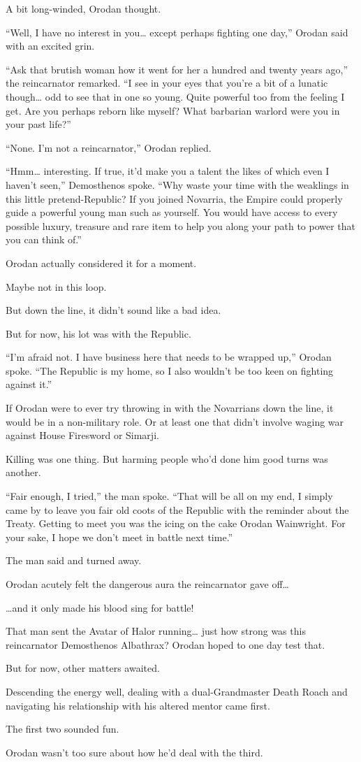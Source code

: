 \documentclass[a4paper,10pt]{book}
\begin{document}
A bit long-winded, Orodan thought.\par
“Well, I have no interest in you… except perhaps fighting one day,” Orodan said with an excited grin.\par
“Ask that brutish woman how it went for her a hundred and twenty years ago,” the reincarnator remarked. “I see in your eyes that you’re a bit of a lunatic though… odd to see that in one so young. Quite powerful too from the feeling I get. Are you perhaps reborn like myself? What barbarian warlord were you in your past life?”\par
“None. I’m not a reincarnator,” Orodan replied.\par
“Hmm… interesting. If true, it’d make you a talent the likes of which even I haven’t seen,” Demosthenos spoke. “Why waste your time with the weaklings in this little pretend-Republic? If you joined Novarria, the Empire could properly guide a powerful young man such as yourself. You would have access to every possible luxury, treasure and rare item to help you along your path to power that you can think of.”\par
Orodan actually considered it for a moment.\par
Maybe not in this loop.\par
But down the line, it didn’t sound like a bad idea.\par
But for now, his lot was with the Republic.\par
“I’m afraid not. I have business here that needs to be wrapped up,” Orodan spoke. “The Republic is my home, so I also wouldn’t be too keen on fighting against it.”\par
If Orodan were to ever try throwing in with the Novarrians down the line, it would be in a non-military role. Or at least one that didn’t involve waging war against House Firesword or Simarji.\par
Killing was one thing. But harming people who'd done him good turns was another.\par
“Fair enough, I tried,” the man spoke. “That will be all on my end, I simply came by to leave you fair old coots of the Republic with the reminder about the Treaty. Getting to meet you was the icing on the cake Orodan Wainwright. For your sake, I hope we don’t meet in battle next time.”\par
The man said and turned away.\par
Orodan acutely felt the dangerous aura the reincarnator gave off…\par
…and it only made his blood sing for battle!\par
That man sent the Avatar of Halor running… just how strong was this reincarnator Demosthenos Albathrax? Orodan hoped to one day test that.\par
But for now, other matters awaited.\par
Descending the energy well, dealing with a dual-Grandmaster Death Roach and navigating his relationship with his altered mentor came first.\par
The first two sounded fun.\par
Orodan wasn’t too sure about how he’d deal with the third.\par
\end{document}
